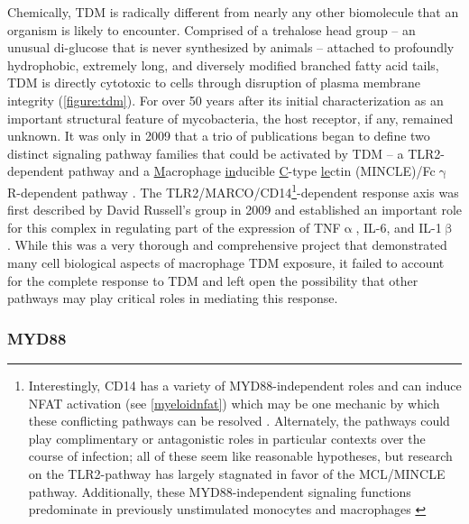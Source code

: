 Chemically, TDM is radically different from nearly any other biomolecule that an organism is likely to encounter. Comprised of a trehalose head group -- an unusual di\hyp{}glucose that is never synthesized by animals \citep{Elbein2003} -- attached to profoundly hydrophobic, extremely long, and diversely modified branched fatty acid tails, TDM is directly cytotoxic to cells through disruption of plasma membrane integrity (\autoref{figure:tdm}). For over 50 years after its initial characterization as an important structural feature of mycobacteria, the host receptor, if any, remained unknown. It was only in 2009 that a trio of publications began to define two distinct signaling pathway families that could be activated by TDM -- a TLR2\hyp{}dependent pathway and a \underline{M}acrophage \underline{in}ducible \underline{C}\hyp{}type \underline{le}ctin (MINCLE)/Fc$\upgamma$R\hyp{}dependent pathway \citep{Werninghaus2009, Ishikawa2009, Bowdish2009}. The TLR2/MARCO/CD14\footnote{Interestingly, CD14 has a variety of MYD88\hyp{}independent roles and can induce NFAT activation (see \autoref{myeloidnfat}) which may be one mechanic by which these conflicting pathways can be resolved \citep{Jiang2005, Nakata2006}. Alternately, the pathways could play complimentary or antagonistic roles in particular contexts over the course of infection; all of these seem like reasonable hypotheses, but research on the TLR2\hyp{}pathway has largely stagnated in favor of the MCL/MINCLE pathway. Additionally, these MYD88\hyp{}independent signaling functions predominate in previously unstimulated monocytes and macrophages \citep{Bjorkbacka2004}}\hyp{}dependent response axis was first described by David Russell's group in 2009 and established an important role for this complex in regulating part of the expression of TNF$\upalpha$, IL\hyp{}6, and IL\hyp{}1$\upbeta$ \citep{Bowdish2009, Manukyan2005}. While this was a very thorough and comprehensive project that demonstrated many cell biological aspects of macrophage TDM exposure, it failed to account for the complete response to TDM and left open the possibility that other pathways may play critical roles in mediating this response. 

\subsubsection{MYD88}

